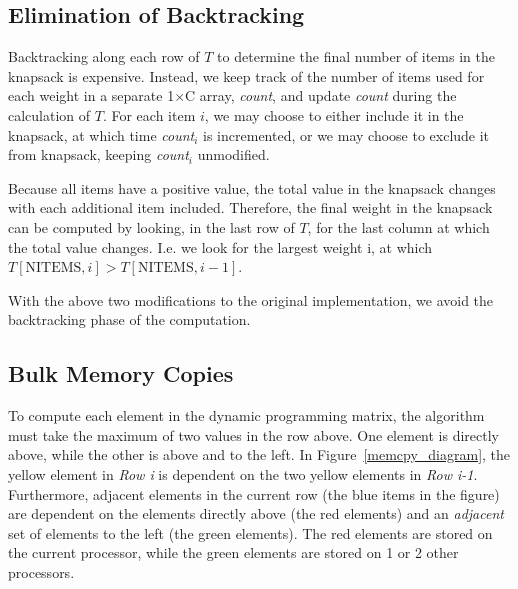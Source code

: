 \documentclass[11pt]{article} %
\begin{document}
\subsection{Elimination of Backtracking}

Backtracking along each row of $T$ to determine the final number of items in the knapsack is expensive. Instead, we keep track of the number of items used for each weight in a separate 1$\times$C array, \emph{count}, and update \emph{count} during the calculation of $T$. For each item $i$, we may choose to either include it in the knapsack, at which time \emph{count}$_i$ is incremented, or we may choose to exclude it from knapsack, keeping \emph{count}$_i$ unmodified.

Because all items have a positive value, the total value in the knapsack changes with each additional item included. Therefore, the final weight in the knapsack can be computed by looking, in the last row of $T$, for the last column at which the total value changes. I.e. we look for the largest weight i, at which $T[\text{NITEMS}, i] > T[\text{NITEMS}, i-1]$.

With the above two modifications to the original implementation, we avoid the backtracking phase of the computation.

\subsection{Bulk Memory Copies}

To compute each element in the dynamic programming matrix, the algorithm must take the maximum of two values in the row above. One element is directly above, while the other is above and to the left. In Figure~\ref{memcpy_diagram}, the yellow element in \emph{Row i} is dependent on the two yellow elements in \emph{Row i-1}. Furthermore, adjacent elements in the current row (the blue items in the figure) are dependent on the elements directly above (the red elements) and an \emph{adjacent} set of elements to the left (the green elements). The red elements are stored on the current processor, while the green elements are stored on 1 or 2 other processors.
\end{document}
